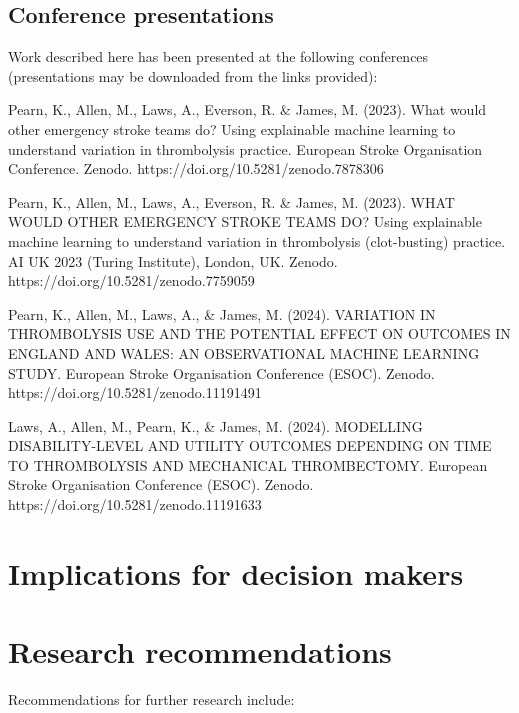 \subsection{Conference presentations}

Work described here has been presented at the following conferences (presentations may be downloaded from the links provided):

Pearn, K., Allen, M., Laws, A., Everson, R. \& James, M. (2023). What would other emergency stroke teams do? Using explainable machine learning to understand variation in thrombolysis practice. European Stroke Organisation Conference. Zenodo. https://doi.org/10.5281/zenodo.7878306

Pearn, K., Allen, M., Laws, A., Everson, R. \& James, M. (2023). WHAT WOULD OTHER EMERGENCY STROKE TEAMS DO? Using explainable machine learning to understand variation in thrombolysis (clot-busting) practice. AI UK 2023 (Turing Institute), London, UK. Zenodo. https://doi.org/10.5281/zenodo.7759059

Pearn, K., Allen, M., Laws, A., \& James, M. (2024). VARIATION IN THROMBOLYSIS USE AND THE POTENTIAL EFFECT ON OUTCOMES IN ENGLAND AND WALES: AN OBSERVATIONAL MACHINE LEARNING STUDY. European Stroke Organisation Conference (ESOC). Zenodo. https://doi.org/10.5281/zenodo.11191491

Laws, A., Allen, M., Pearn, K., \& James, M. (2024). MODELLING DISABILITY-LEVEL AND UTILITY OUTCOMES DEPENDING ON TIME TO THROMBOLYSIS AND MECHANICAL THROMBECTOMY. European Stroke Organisation Conference (ESOC). Zenodo. https://doi.org/10.5281/zenodo.11191633

\section{Implications for decision makers}

\section{Research recommendations}

Recommendations for further research include:

